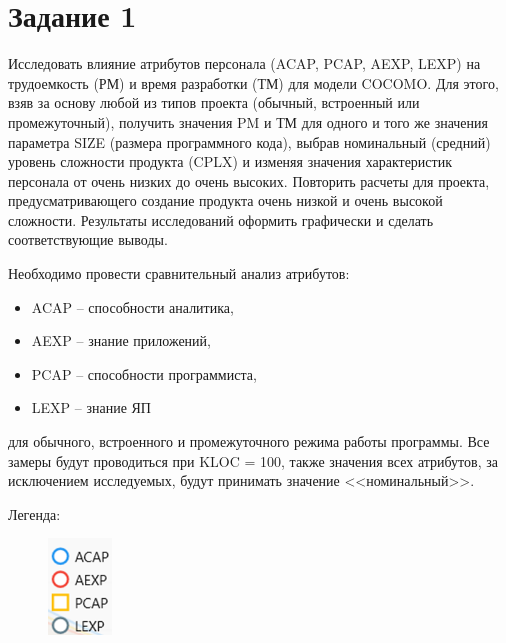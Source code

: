 \section*{Задание 1}

Исследовать влияние атрибутов персонала (ACAP, PCAP, AEXP, LEXP) на трудоемкость (РМ) и время разработки (ТМ) для модели COCOMO. Для этого, взяв за основу любой из типов проекта (обычный, встроенный или промежуточный), получить значения PM и ТМ для одного и того же значения параметра SIZE (размера программного кода), выбрав номинальный (средний) уровень сложности продукта (CPLX) и изменяя значения характеристик персонала от очень низких до очень высоких. Повторить расчеты для проекта, предусматривающего создание продукта очень низкой и очень высокой сложности. Результаты исследований оформить графически и сделать соответствующие выводы.  

Необходимо провести сравнительный анализ атрибутов:

\begin{itemize}
	\item ACAP -- способности аналитика, 
	\item AEXP -- знание приложений, 
	\item PCAP -- способности программиста, 
	\item LEXP -- знание ЯП
\end{itemize}

для обычного, встроенного и промежуточного режима работы программы. Все замеры будут проводиться при KLOC = 100, также значения всех атрибутов, за исключением исследуемых, будут принимать значение <<номинальный>>.

Легенда:
\begin{figure}[H]
	\begin{center}
		\includegraphics[width=0.15\textwidth]{imgs/task_1_0.png}
	\end{center}
\end{figure}

